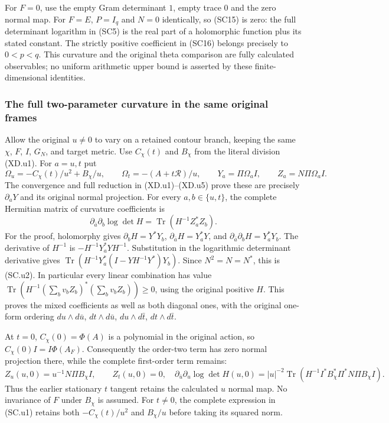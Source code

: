 For $F=0$, use the empty Gram determinant $1$, empty trace $0$
and the zero normal map.  For $F=E$, $P=I_q$ and $N=0$ identically,
so (SC15) is zero: the full determinant logarithm in (SC5) is the
real part of a holomorphic function plus its stated constant.
The strictly positive coefficient in (SC16) belongs precisely to
$0<p<q$.  This curvature and the original theta comparison are
fully calculated observables; no uniform arithmetic upper bound is
asserted by these finite-dimensional identities.


\subsubsection{The full two-parameter curvature in the same original frames}
Allow the original $u\ne0$ to vary on a retained contour branch,
keeping the same $\chi$, $F$, $I$, $G_N$, and target metric.
Use $C_\chi(t)$ and $B_\chi$ from the literal division (XD.u1).
For $a=u,t$ put
\[
 \Omega_u=-C_\chi(t)/u^2+B_\chi/u,
 \qquad\Omega_t=-(A+t\mathcal R)/u,
 \qquad Y_a=\Pi\Omega_a I,
 \qquad Z_a=N\Pi\Omega_a I.                         \tag{SC.u1}
\]
The convergence and full reduction in (XD.u1)--(XD.u5) prove
these are precisely $\partial_aY$ and its original normal
projection.  For every $a,b\in\{u,t\}$, the complete Hermitian
matrix of curvature coefficients is
\[
 \boxed{\partial_{\bar a}\partial_b\log\det H
          =\operatorname{Tr}(H^{-1}Z_a^*Z_b).}         \tag{SC.u2}
\]
For the proof, holomorphy gives $\partial_bH=Y^*Y_b$,
$\partial_{\bar a}H=Y_a^*Y$, and
$\partial_{\bar a}\partial_bH=Y_a^*Y_b$.
The derivative of $H^{-1}$ is
$-H^{-1}Y_a^*YH^{-1}$.  Substitution in the logarithmic
determinant derivative gives
$\operatorname{Tr}(H^{-1}Y_a^*(I-YH^{-1}Y^*)Y_b)$.
Since $N^2=N=N^*$, this is (SC.u2).  In particular every
linear combination has value
$\operatorname{Tr}(H^{-1}(\sum_b v_bZ_b)^*
(\sum_b v_bZ_b))\ge0$, using the original positive $H$.
This proves the mixed coefficients as well as both diagonal
ones, with the original one-form ordering
$du\wedge d\bar u$, $dt\wedge d\bar u$,
$du\wedge d\bar t$, $dt\wedge d\bar t$.

At $t=0$, $C_\chi(0)=\Phi(A)$ is a polynomial in the
original action, so $C_\chi(0)I=I\Phi(A_F)$.
Consequently the order-two term has zero normal projection
there, while the complete first-order term remains:
\[
 Z_u(u,0)=u^{-1}N\Pi B_\chi I,\qquad Z_t(u,0)=0,
 \quad
 \partial_{\bar u}\partial_u\log\det H(u,0)
 =|u|^{-2}\operatorname{Tr}
       (H^{-1}I^*B_\chi^*\Pi^*N\Pi B_\chi I).
 \tag{SC.u3}
\]
Thus the earlier stationary $t$ tangent retains the calculated
$u$ normal map.  No invariance of $F$ under $B_\chi$ is assumed.
For $t\ne0$, the complete expression in (SC.u1) retains both
$-C_\chi(t)/u^2$ and $B_\chi/u$ before taking its squared norm.

